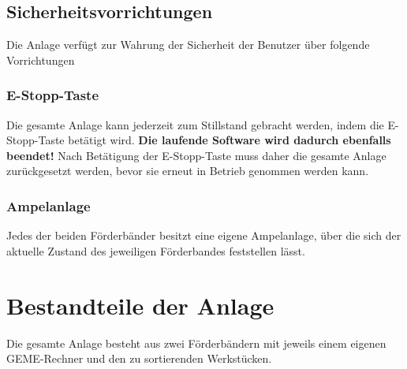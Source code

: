 \documentclass[oneside,a4paper,titlepage]{scrartcl} %
\begin{document}
\subsection{Sicherheitsvorrichtungen}
Die Anlage verfügt zur Wahrung der Sicherheit der Benutzer über folgende Vorrichtungen
\subsubsection{E-Stopp-Taste}
Die gesamte Anlage kann jederzeit zum Stillstand gebracht werden, indem die E-Stopp-Taste betätigt wird.\newline
\textbf{Die laufende Software wird dadurch ebenfalls beendet!}\newline
Nach Betätigung der E-Stopp-Taste muss daher die gesamte Anlage zurückgesetzt werden, bevor sie erneut in Betrieb genommen werden kann.
\subsubsection{Ampelanlage}
Jedes der beiden Förderbänder besitzt eine eigene Ampelanlage, über die sich der aktuelle Zustand des jeweiligen Förderbandes feststellen lässt.

\newpage

\section{Bestandteile der Anlage}
Die gesamte Anlage besteht aus zwei Förderbändern mit jeweils einem eigenen GEME-Rechner und den zu sortierenden Werkstücken.
\end{document}
